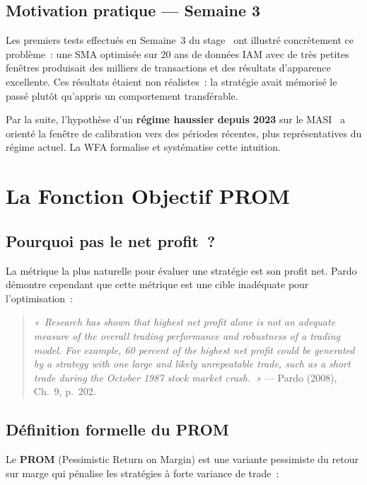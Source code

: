 \subsection{Motivation pratique — Semaine 3}

Les premiers tests effectués en Semaine~3 du stage~\cite{rapport_s3} ont illustré
concrètement ce problème~: une SMA optimisée sur 20 ans de données IAM avec de très
petites fenêtres produisait des milliers de transactions et des résultats d'apparence
excellente. Ces résultats étaient non réalistes~: la stratégie avait mémorisé le
passé plutôt qu'appris un comportement transférable.

\medskip

Par la suite, l'hypothèse d'un \textbf{régime haussier depuis 2023} sur le MASI~\cite{rapport_s4}
a orienté la fenêtre de calibration vers des périodes récentes, plus représentatives
du régime actuel. La WFA formalise et systématise cette intuition.

\section{La Fonction Objectif PROM}
\label{sec:prom}

\subsection{Pourquoi pas le net profit~?}

La métrique la plus naturelle pour évaluer une stratégie est son profit net. Pardo
démontre cependant que cette métrique est une cible inadéquate pour l'optimisation~:

\begin{quote}
\textit{«~Research has shown that highest net profit alone is not an adequate measure
of the overall trading performance and robustness of a trading model. For example,
60 percent of the highest net profit could be generated by a strategy with one large
and likely unrepeatable trade, such as a short trade during the October 1987 stock
market crash.~»} — Pardo (2008), Ch.~9, p.~202.
\end{quote}

\subsection{Définition formelle du PROM}

Le \textbf{PROM} (Pessimistic Return on Margin) est une variante pessimiste du
retour sur marge qui pénalise les stratégies à forte variance de trade~:

